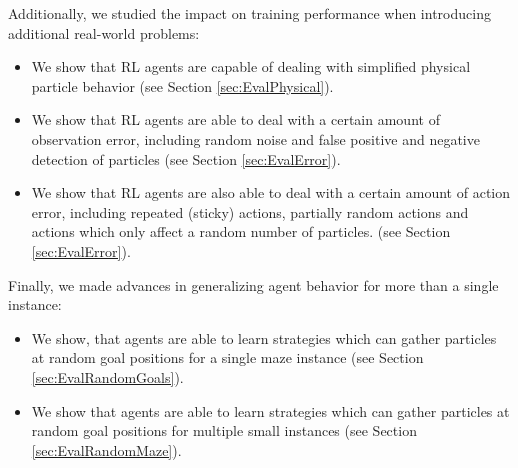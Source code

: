 \noindent Additionally, we studied the impact on training performance when introducing additional real-world problems:

\begin{itemize}
    \item We show that RL agents are capable of dealing with simplified physical particle behavior (see Section \ref{sec:EvalPhysical}).
    \item We show that RL agents are able to deal with a certain amount of observation error, including random noise and false positive and negative detection of particles (see Section \ref{sec:EvalError}).
    \item We show that RL agents are also able to deal with a certain amount of action error, including repeated (sticky) actions, partially random actions and actions which only affect a random number of particles. (see Section \ref{sec:EvalError}). 
\end{itemize}

\noindent Finally, we made advances in generalizing agent behavior for more than a single instance:

\begin{itemize}
    \item We show, that agents are able to learn strategies which can gather particles at random goal positions for a single maze instance (see Section \ref{sec:EvalRandomGoals}).
    \item We show that agents are able to learn strategies which can gather particles at random goal positions for multiple small instances (see Section \ref{sec:EvalRandomMaze}).
\end{itemize}
